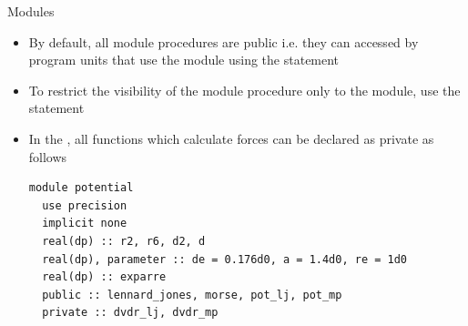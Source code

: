 \documentclass[10pt,t]{beamer}
\begin{document}
\begin{frame}{Modules}
  \framebreak
    \begin{itemize}
      \item By default, all module procedures are public i.e. they can accessed by program units that use the module using the  statement
      \item To restrict the visibility of the module procedure only to the module, use the  statement
      \item In the , all functions which calculate forces can be declared as private as follows
        \begin{lstlisting}[language={[90]Fortran},basicstyle=\fontsize{5}{6}\selectfont\ttfamily,mathescape]
module potential
  use precision
  implicit none
  real(dp) :: r2, r6, d2, d
  real(dp), parameter :: de = 0.176d0, a = 1.4d0, re = 1d0
  real(dp) :: exparre
  public :: lennard_jones, morse, pot_lj, pot_mp
  private :: dvdr_lj, dvdr_mp
  

\end{lstlisting}
\end{itemize}
\end{frame}
\end{document}
